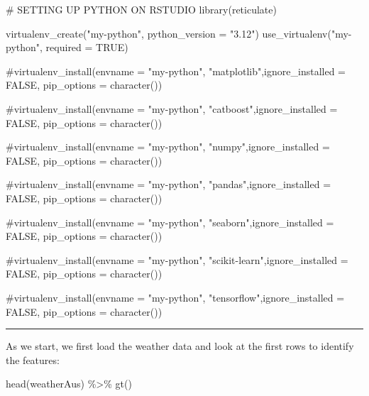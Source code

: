 \documentclass[
  letterpaper,
  DIV=11,
  numbers=noendperiod]{scrartcl}
\newenvironment{Shaded}{\begin{snugshade}}{\end{snugshade}}
\newcommand{\AttributeTok}[1]{\textcolor[rgb]{0.40,0.45,0.13}{#1}}
\newcommand{\CommentTok}[1]{\textcolor[rgb]{0.37,0.37,0.37}{#1}}
\newcommand{\ConstantTok}[1]{\textcolor[rgb]{0.56,0.35,0.01}{#1}}
\newcommand{\FunctionTok}[1]{\textcolor[rgb]{0.28,0.35,0.67}{#1}}
\newcommand{\NormalTok}[1]{\textcolor[rgb]{0.00,0.23,0.31}{#1}}
\newcommand{\SpecialCharTok}[1]{\textcolor[rgb]{0.37,0.37,0.37}{#1}}
\newcommand{\StringTok}[1]{\textcolor[rgb]{0.13,0.47,0.30}{#1}}
\begin{document}
\begin{Shaded}
\begin{Highlighting}[]
\CommentTok{\# SETTING UP PYTHON ON RSTUDIO}
\FunctionTok{library}\NormalTok{(reticulate)}

\FunctionTok{virtualenv\_create}\NormalTok{(}\StringTok{"my{-}python"}\NormalTok{, }\AttributeTok{python\_version =} \StringTok{"3.12"}\NormalTok{)}
\FunctionTok{use\_virtualenv}\NormalTok{(}\StringTok{"my{-}python"}\NormalTok{, }\AttributeTok{required =} \ConstantTok{TRUE}\NormalTok{)}

\CommentTok{\#virtualenv\_install(envname = "my{-}python", "matplotlib",ignore\_installed = FALSE, pip\_options = character())}

\CommentTok{\#virtualenv\_install(envname = "my{-}python", "catboost",ignore\_installed = FALSE, pip\_options = character())}

\CommentTok{\#virtualenv\_install(envname = "my{-}python", "numpy",ignore\_installed = FALSE, pip\_options = character())}

\CommentTok{\#virtualenv\_install(envname = "my{-}python", "pandas",ignore\_installed = FALSE, pip\_options = character())}

\CommentTok{\#virtualenv\_install(envname = "my{-}python", "seaborn",ignore\_installed = FALSE, pip\_options = character())}

\CommentTok{\#virtualenv\_install(envname = "my{-}python", "scikit{-}learn",ignore\_installed = FALSE, pip\_options = character())}

\CommentTok{\#virtualenv\_install(envname = "my{-}python", "tensorflow",ignore\_installed = FALSE, pip\_options = character())}
\end{Highlighting}
\end{Shaded}

\begin{center}\rule{0.5\linewidth}{0.5pt}\end{center}

As we start, we first load the weather data and look at the first rows
to identify the features:

\begin{Shaded}
\begin{Highlighting}[]
\FunctionTok{head}\NormalTok{(weatherAus) }\SpecialCharTok{\%\textgreater{}\%} \FunctionTok{gt}\NormalTok{()}
\end{Highlighting}
\end{Shaded}
\end{document}
